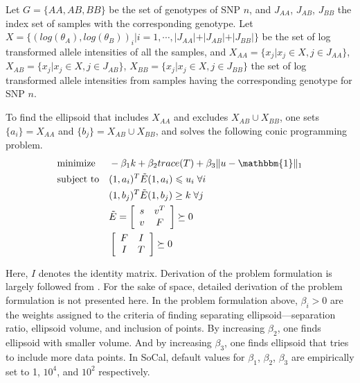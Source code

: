 \documentclass{scrartcl}
\begin{document}
\par
Let $G=\{AA,AB,BB\}$ be the set of genotypes of SNP $n$, and $J_{AA}$,
$J_{AB}$, $J_{BB}$ the index set of samples with the corresponding genotype.
Let $X=\{(log(\theta_A),log(\theta_B))_i|i=1,\cdots,
|J_{AA}|+|J_{AB}|+|J_{BB}|\}$ be the set of log transformed allele intensities
of all the samples, and $X_{AA}=\{x_j|x_j \in X, j \in J_{AA}\}$,
$X_{AB}=\{x_j|x_j \in X, j \in J_{AB}\}$,
$X_{BB}=\{x_j|x_j \in X, j \in J_{BB}\}$ the set of log transformed allele
intensities from samples having the corresponding genotype for SNP $n$.

\par
To find the ellipsoid that includes $X_{AA}$ and excludes
$X_{AB} \cup X_{BB}$, one
sets $\{a_i\}=X_{AA}$ and $\{b_j\}=X_{AB} \cup X_{BB}$, and
solves the following conic programming problem.
\begin{equation*}
\begin{aligned}
& \text{minimize}
&& -{\beta_{1}}k+{\beta_{2}} trace(T)+\beta_{3} \|u-\mathbbm{1}\|_1 \\  
& \text{subject to}
&& (1,a_i)^T\tilde{E}(1,a_i)\leqslant u_i \; \forall i \\
&&&(1,b_j)^T\tilde{E}(1,b_j) \ge k \; \forall j \\
&&&\tilde{E}=
    \left[
        \begin{array}{cc}
            s & v^T \\
            v & F
        \end{array}
    \right] \succeq 0 \\
&&&\left[
        \begin{array}{cc}
            F & I \\
            I & T
        \end{array}
    \right] \succeq 0
\end{aligned}
\end{equation*}

\par
Here, $I$ denotes the identity matrix.
Derivation of the problem formulation is largely followed from
\cite{glineur1998}.
For the sake of space, detailed derivation of the problem formulation is not
presented here.
In the problem formulation above, $\beta_{i} > 0$ are the weights assigned to
the criteria of finding separating ellipsoid---separation ratio,
ellipsoid volume, and inclusion of points.
By increasing $\beta_2$, one finds ellipsoid with
smaller volume.
And by increasing $\beta_3$, one finds ellipsoid that tries to
include more data points.
In SoCal, default values for $\beta_1$, $\beta_2$, $\beta_3$ are
empirically set to 1, $10^4$, and $10^2$ respectively.
\end{document}
